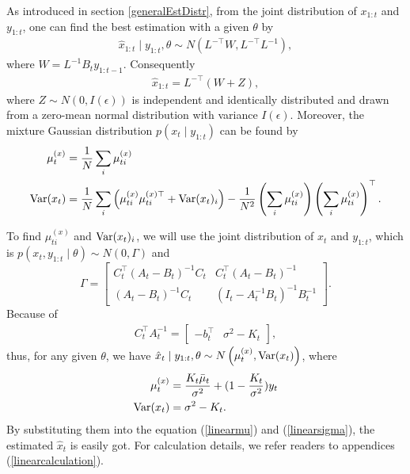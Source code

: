 As introduced in section \ref{generalEstDistr}, from the joint distribution of $x_{1:t}$ and $y_{1:t}$, one can find the best estimation with a given $\theta$ by
\begin{align*}
\hat{x}_{1:t} \mid y_{1:t},\theta \sim N(L^{-\top}W,L^{-\top}L^{-1}),
\end{align*}
where $W = L^{-1}B_{t}y_{1:t-1}$. 
Consequently 
\begin{align*}
\hat{x}_{1:t} = L^{-\top}(W+Z),
\end{align*}
where $Z \sim N(0, I(\epsilon))$ is independent and identically distributed and drawn from a zero-mean normal distribution with variance $ I(\epsilon)$. Moreover, the mixture Gaussian distribution  $p(x_t \mid y_{1:t})$ can be found by 
\begin{align}
\mu_t^{(x)} &= \frac{1}{N} \sum_i \mu_{ti}^{(x)} \label{linearmu}  \\
\mathrm{Var}(x_t) &= \frac{1}{N} \sum_i \left( \mu_{ti}^{(x)}  \mu_{ti}^{(x)\top} +\mathrm{Var}(x_t)_i\right) -\frac{1}{N^2} \left(  \sum_i  \mu_{ti}^{(x)} \right) \left( \sum_i \mu_{ti}^{(x)} \right) ^\top.\label{linearsigma} 
\end{align}


To find $\mu_{ti}^{(x)}$ and $\mathrm{Var}(x_t)_i$, we will use the joint distribution of $x_{t}$ and $y_{1:t}$, which is $p(x_{t}, y_{1:t}  \mid  \theta)\sim N(0,\Gamma)$ and 
\begin{equation*}
\Gamma=\begin{bmatrix} C_{t}^\top(A_t-B_t)^{-1}C_{t} & C_{t}^\top(A_t-B_t)^{-1}\\(A_t-B_t)^{-1}C_{t} & (I_t-A_t^{-1}B_t)^{-1}B_t^{-1} \end{bmatrix}.
\end{equation*}
Because of 
\begin{align*}
C_{t}^\top A_{t}^{-1} = \left[\begin{matrix} - b_{t}^\top & \sigma^2- K_{t} \end{matrix} \right],
\end{align*}
thus, for any given $\theta$, we have $\hat{x}_{t}\mid y_{1:t},\theta \sim N\left( \mu_{t}^{(x)},\mathrm{Var}(x_t) \right)$, where
\begin{align}
\mu_{t}^{(x)} &  =  \frac{K_{t}\bar{\mu}_{t}}{\sigma^2}+(1-\frac{K_{t}}{\sigma^2})y_{t} \\
\mathrm{Var}(x_t)&= \sigma^2-K_{t}.
\end{align}
By substituting them into the equation (\ref{linearmu}) and (\ref{linearsigma}), the estimated $\hat{x}_t$ is easily got. For calculation details, we refer readers to appendices (\ref{linearcalculation}). 


